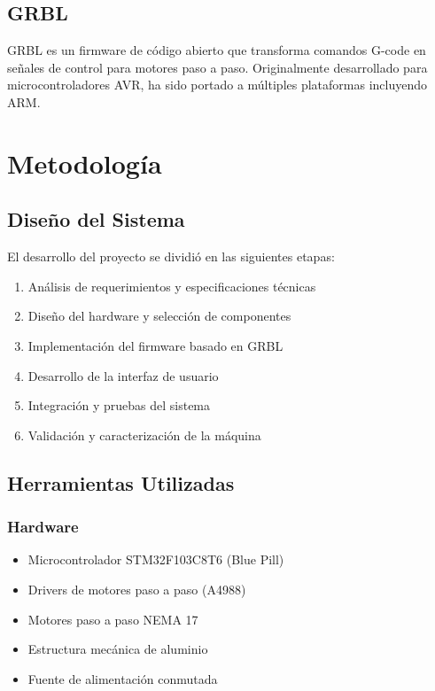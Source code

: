 \documentclass[12pt]{article}
\begin{document}
\subsection{GRBL}

GRBL es un firmware de código abierto que transforma comandos G-code en señales de control para motores paso a paso. Originalmente desarrollado para microcontroladores AVR, ha sido portado a múltiples plataformas incluyendo ARM.

\section{Metodología}

\subsection{Diseño del Sistema}

El desarrollo del proyecto se dividió en las siguientes etapas:

\begin{enumerate}
    \item Análisis de requerimientos y especificaciones técnicas
    \item Diseño del hardware y selección de componentes
    \item Implementación del firmware basado en GRBL
    \item Desarrollo de la interfaz de usuario
    \item Integración y pruebas del sistema
    \item Validación y caracterización de la máquina
\end{enumerate}

\subsection{Herramientas Utilizadas}

\subsubsection{Hardware}
\begin{itemize}
    \item Microcontrolador STM32F103C8T6 (Blue Pill)
    \item Drivers de motores paso a paso (A4988)
    \item Motores paso a paso NEMA 17
    \item Estructura mecánica de aluminio
    \item Fuente de alimentación conmutada
\end{itemize}
\end{document}
